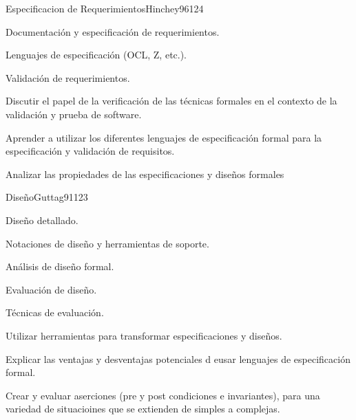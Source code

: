 \begin{syllabus}
\begin{unit}{Especificacion de Requerimientos}{Hinchey96}{12}{4}
   \begin{topics}
      \item Documentación y especificación de requerimientos.
      \begin{inparaenum}
         \item Lenguajes de especificación (OCL, Z, etc.).
      \end{inparaenum}
      \item Validación de requerimientos.
   \end{topics}
   \begin{learningoutcomes}
      \item Discutir el papel de la verificación de las técnicas formales en el contexto de la validación y prueba de software.
      \item Aprender a utilizar los diferentes lenguajes de especificación formal para la especificación y validación de requisitos.
      \item Analizar las propiedades de las especificaciones y diseños formales
   \end{learningoutcomes}
\end{unit}

\begin{unit}{Diseño}{Guttag91}{12}{3}
   \begin{topics}
      \item Diseño detallado.
      \item Notaciones de diseño y herramientas de soporte.
      \begin{inparaenum}
         \item Análisis de diseño formal.
      \end{inparaenum}
      \item Evaluación de diseño.
      \begin{inparaenum}
         \item Técnicas de evaluación.
      \end{inparaenum}
   \end{topics}
   \begin{learningoutcomes}
       \item Utilizar herramientas para transformar especificaciones y diseños.
       \item Explicar las ventajas y desventajas potenciales d eusar lenguajes de especificación formal.
       \item Crear y evaluar aserciones (pre y post condiciones e invariantes), para una variedad de situacioines que se extienden de simples a complejas.
   \end{learningoutcomes}
\end{unit}


\end{syllabus}
